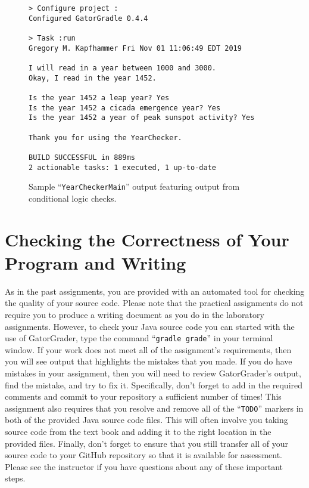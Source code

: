 \documentclass[11pt]{article}
\newcommand{\gatorgraderstart}{\command{gradle grade}}
\newcommand{\command}[1]{``\lstinline{#1}''}
\begin{document}
\begin{figure}[tb]
\begin{Verbatim}[commandchars=\\\{\}]
> Configure project :
Configured GatorGradle 0.4.4

> Task :run
Gregory M. Kapfhammer Fri Nov 01 11:06:49 EDT 2019

I will read in a year between 1000 and 3000.
Okay, I read in the year 1452.

Is the year 1452 a leap year? Yes
Is the year 1452 a cicada emergence year? Yes
Is the year 1452 a year of peak sunspot activity? Yes

Thank you for using the YearChecker.

BUILD SUCCESSFUL in 889ms
2 actionable tasks: 1 executed, 1 up-to-date
\end{Verbatim}
\vspace*{-.1in}
\caption{Sample ``{\tt YearCheckerMain}'' output featuring output from conditional logic checks.}
\label{mad}
\end{figure}

\section*{Checking the Correctness of Your Program and Writing}

As in the past assignments, you are provided with an automated tool for checking
the quality of your source code. Please note that the practical assignments do
not require you to produce a writing document as you do in the laboratory
assignments. However, to check your Java source code you can started with the
use of GatorGrader, type the command \gatorgraderstart{} in your terminal
window. If your work does not meet all of the assignment's requirements, then
you will see output that highlights the mistakes that you made. If you do have
mistakes in your assignment, then you will need to review GatorGrader's output,
find the mistake, and try to fix it. Specifically, don't forget to add in the
required comments and commit to your repository a sufficient number of times!
This assignment also requires that you resolve and remove all of the
\command{TODO} markers in both of the provided Java source code files. This will
often involve you taking source code from the text book and adding it to the
right location in the provided files. Finally, don't forget to ensure that you
still transfer all of your source code to your GitHub repository so that it is
available for assessment. Please see the instructor if you have questions about
any of these important steps.
\end{document}

